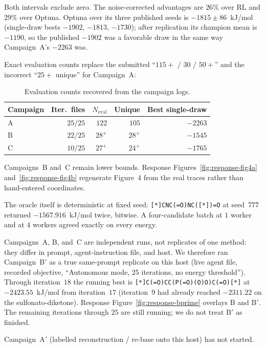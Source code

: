 \documentclass[11pt]{article}
\newcounter{responsetab}
\newcommand{\responsetab}[1]{%
  \refstepcounter{responsetab}%
  \caption{#1}%
  \label{tab:response-\theresponsetab}%
}
\newenvironment{rtable}[1]{%
  \begin{table}[H]
  \centering
  \small
  \setlength{\tabcolsep}{4.5pt}%
  \begin{threeparttable}
    \responsetab{#1}%
}{%
  \end{threeparttable}
  \end{table}
}
\begin{document}
Both intervals exclude zero.
The noise-corrected advantages are $26\%$ over RL and $29\%$ over Optuna.
Optuna over its three published seeds is $-1815\pm 86$~kJ/mol (single-draw bests $-1902$, $-1813$, $-1730$); after replication its champion mean is $-1190$, so the published $-1902$ was a favorable draw in the same way Campaign~A's $-2263$ was.

Exact evaluation counts replace the submitted ``$115+$ / $30$ / $50+$'' and the incorrect ``$25+$ unique'' for Campaign~A:

\begin{rtable}{Evaluation counts recovered from the campaign logs.}
  \begin{tabular}{lrrrr}
    \toprule
    Campaign & Iter.\ files & $N_\text{eval}$ & Unique & Best single-draw \\
    \midrule
    A & $25/25$ & $122$ & $105$ & $-2263$ \\
    B & $22/25$ & $28^+$ & $28^+$ & $-1545$ \\
    C & $10/25$ & $27^+$ & $24^+$ & $-1765$ \\
    \bottomrule
  \end{tabular}
\end{rtable}

Campaigns~B and~C remain lower bounds.
Response Figures~\ref{fig:response-fig4a} and~\ref{fig:response-fig4b} regenerate Figure~4 from the real traces rather than hand-entered coordinates.

The oracle itself is deterministic at fixed seed: \texttt{[*]CNC(=O)NC([*])=O} at seed~$777$ returned $-1567.916$~kJ/mol twice, bitwise.
A four-candidate batch at $1$ worker and at $4$ workers agreed exactly on every energy.

Campaigns~A, B, and~C are independent runs, not replicates of one method: they differ in prompt, agent-instruction file, and host.
We therefore ran Campaign~B$'$ as a true same-prompt replicate on this host (live agent file, recorded objective, ``Autonomous mode, $25$ iterations, no energy threshold'').
Through iteration~$18$ the running best is \texttt{[*]C(=O)CC(P(=O)(O)O)C(=O)[*]} at $-2423.55$~kJ/mol from iteration~$17$ (iteration~$9$ had already reached $-2311.22$ on the sulfonato-diketone).
Response Figure~\ref{fig:response-bprime} overlays B and B$'$.
The remaining iterations through $25$ are still running; we do not treat B$'$ as finished.

Campaign~A$'$ (labelled reconstruction / re-base onto this host) has not started.
\end{document}

